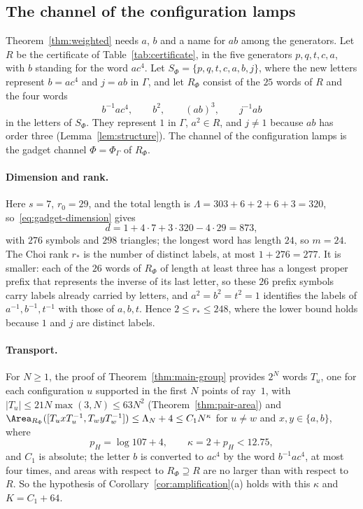 \subsection{The channel of the configuration lamps}\label{sec:lamp-channel}

Theorem~\ref{thm:weighted} needs $a$, $b$ and a name for $ab$ among the generators. Let $R$ be the certificate of Table~\ref{tab:certificate}, in
the five generators $p,q,t,c,a$, with $b$ standing for the word $ac^4$. Let $S_\Phi=\{p,q,t,c,a,b,j\}$, where the new letters represent
$b=ac^4$ and $j=ab$ in $\Gamma$, and let $R_\Phi$ consist of the $25$ words of $R$ and the four words
\[
b^{-1}ac^4,\qquad b^2,\qquad (ab)^3,\qquad j^{-1}ab
\]
in the letters of $S_\Phi$. They represent $1$ in $\Gamma$, $a^2\in R$, and $j\ne1$ because $ab$ has order three (Lemma~\ref{lem:structure}). The
channel of the configuration lamps is the gadget channel $\Phi=\Phi_\Gamma$ of $R_\Phi$.

\paragraph{Dimension and rank.} Here $s=7$, $r_0=29$, and the total length is $\Lambda=303+6+2+6+3=320$, so~\eqref{eq:gadget-dimension} gives
\[
d=1+4\cdot7+3\cdot320-4\cdot29=873 ,
\]
with $276$ symbols and $298$ triangles; the longest word has length $24$, so $m=24$. The Choi rank $r_*$ is the number of distinct labels, at most
$1+276=277$. It is smaller: each of the $26$ words of $R_\Phi$ of length at least three has a longest proper prefix that represents the inverse of
its last letter, so these $26$ prefix symbols carry labels already carried by letters, and $a^2=b^2=t^2=1$ identifies the labels of
$a^{-1},b^{-1},t^{-1}$ with those of $a,b,t$. Hence $2\le r_*\le248$, where the lower bound holds because $1$ and $j$ are distinct labels.

\paragraph{Transport.} For $N\ge1$, the proof of Theorem~\ref{thm:main-group} provides $2^N$ words $T_u$, one for each configuration $u$
supported in the first $N$ points of ray~$1$, with $|T_u|\le21N\max(3,N)\le63N^2$ (Theorem~\ref{thm:pair-area}) and
$\Area_{R_\Phi}([T_uxT_u^{-1},T_wyT_w^{-1}])\le\Lambda_N+4\le C_1N^{\kappa}$ for $u\ne w$ and $x,y\in\{a,b\}$, where
\[
p_H=\log107+4,\qquad \kappa=2+p_H<12.75,
\]
and $C_1$ is absolute; the letter $b$ is converted to $ac^4$ by the word $b^{-1}ac^4$, at most four times, and areas with respect to
$R_\Phi\supseteq R$ are no larger than with respect to $R$. So the hypothesis of Corollary~\ref{cor:amplification}(a) holds with this $\kappa$ and
$K=C_1+64$.

